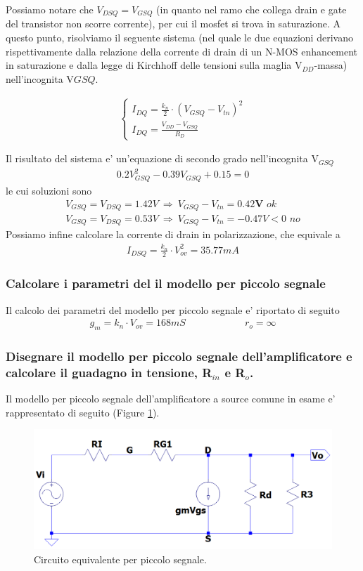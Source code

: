 \documentclass[a4paper,10pt]{article}
\begin{document}
Possiamo notare che $V_{DSQ}=V_{GSQ}$ (in quanto nel ramo che collega drain e gate del transistor non scorre corrente), per cui il mosfet si trova in saturazione. A questo punto, risolviamo il seguente sistema (nel quale le due equazioni derivano rispettivamente dalla relazione della corrente di drain di un N-MOS enhancement in saturazione e dalla legge di Kirchhoff delle tensioni sulla maglia V$_{DD}$-massa) nell'incognita V$GSQ$.

\begin{align*}
	\begin{cases}
		I_{DQ} = \frac{k_n}{2} \cdot (V_{GSQ}-V_{tn})^2 \\[4pt]
		I_{DQ} = \frac{V_{DD}-V_{GSQ}}{R_D}
	\end{cases}
\end{align*}

\noindent Il risultato del sistema e' un'equazione di secondo grado nell'incognita V$_{GSQ}$
\begin{align*}
0.2 V_{GSQ}^2 - 0.39 V_{GSQ} + 0.15 = 0 
\end{align*}
le cui soluzioni sono
\begin{align*}
V_{GSQ} = V_{DSQ} = 1.42V \ \Rightarrow \  V_{GSQ} - V_{tn} = \mathbf{0.42V}  \textit{  ok}\\
V_{GSQ} = V_{DSQ} = 0.53V \  \Rightarrow \ V_{GSQ} - V_{tn} = -0.47V < 0 \textit{  no}
\end{align*}
Possiamo infine calcolare la corrente di drain in polarizzazione, che equivale a 
\begin{align*}
I_{DSQ} = \frac{k_n}{2}\cdot V_{ov}^2 = 35.77 mA
\end{align*}

\subsubsection{Calcolare i parametri del il modello per piccolo segnale}
Il calcolo dei parametri del modello per piccolo segnale e' riportato di seguito
\begin{align*}
g_m = k_n \cdot V_{ov} = 168mS \qquad \qquad \qquad r_o = \infty
\end{align*}

\subsubsection{Disegnare il modello per piccolo segnale dell'amplificatore e calcolare il guadagno in tensione, R$_{in}$ e R$_o$.}
Il modello per piccolo segnale dell'amplificatore a source comune in esame e' rappresentato di seguito (Figure \ref{fig:pic1}). 
\begin{figure}[h!]
 	\includegraphics[width=0.5\linewidth]{es2-1-pc.png}
 	\centering
 	\caption{Circuito equivalente per piccolo segnale.}
  	\label{fig:pic1}
\end{figure}
\end{document}
